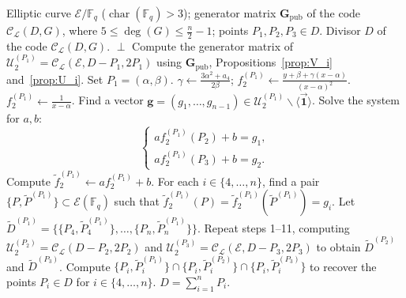 \documentclass[sn-mathphys-num]{sn-jnl_modified}
\newcommand{\FF}{\ensuremath{\mathbb{F}}}
\begin{document}
\begin{algorithm}[H]
\fontsize{9pt}{9pt}\selectfont
\caption{Recovering the divisor $D$}
\label{alg:attack}
\begin{algorithmic}[1]
\Require Elliptic curve $\mathcal{E}/\mathbb{F}_q$ ($\operatorname{char}(\mathbb{F}_q) > 3$); generator matrix $\mathbf{G}_{\operatorname{pub}}$ of the code $\mathcal{C}_\mathscr{L}(D, G)$, where $5 \leq \deg(G) \leq \frac{n}{2}-1$; points $P_1, P_2, P_3 \in D$.
\Ensure Divisor $D$ of the code $\mathcal{C}_\mathscr{L}(D, G)$.
\State \Return $\perp$ \Comment{Probability $1 - \mathcal{O}(|\mathcal{E}(\FF_q)|^{-2})$}
\EndIf
\State Compute the generator matrix of $\mathcal{U}_2^{(P_1)} = \mathcal{C}_\mathscr{L}(\mathcal{E}, D - P_1, 2P_1)$ using $\mathbf{G}_{\operatorname{pub}}$, Propositions~\ref{prop:V_i} and~\ref{prop:U_i}. Set $P_1 = (\alpha, \beta)$.
 
    \State $\gamma \gets \frac{3\alpha^2 + a_4}{2\beta}$; $f_2^{(P_1)} \gets \frac{y + \beta + \gamma (x - \alpha)}{(x - \alpha)^2}$.
\Else
    \State $f_2^{(P_1)} \gets \frac{1}{x - \alpha}$.
\EndIf
\State Find a vector $\mathbf{g} = (g_1, \dots, g_{n-1}) \in \mathcal{U}_2^{(P_1)} \backslash \langle\Vec{\mathbf{1}}\rangle$.
\State Solve the system for $a, b$:
\[
\begin{cases}
a f_2^{(P_1)}(P_2) + b = g_1, \\
a f_2^{(P_1)}(P_3) + b = g_2.
\end{cases}
\]
\State Compute $\widetilde{f}_2^{(P_1)} \gets a f_2^{(P_1)} + b$.
\State For each $i \in \{4, \dots, n\}$, find a pair $\{P, \widetilde{P}^{(P_1)}\} \subset \mathcal{E}(\mathbb{F}_q)$ such that $\widetilde{f}_2^{(P_1)}(P) = \widetilde{f}_2^{(P_1)}(\widetilde{P}^{(P_1)}) = g_i$. Let $\widetilde{D}^{(P_1)} = \{\{P_4, \widetilde{P}_4^{(P_1)}\}, \dots, \{P_n, \widetilde{P}_n^{(P_1)}\}\}$.
\State Repeat steps 1--11, computing $\mathcal{U}_2^{(P_2)} = \mathcal{C}_\mathscr{L}(D - P_2, 2P_2)$ and $\mathcal{U}_2^{(P_3)} = \mathcal{C}_\mathscr{L}(\mathcal{E}, D - P_3, 2P_3)$ to obtain $\widetilde{D}^{(P_2)}$ and $\widetilde{D}^{(P_3)}$.
\State Compute $\{P_i, \widetilde{P}_i^{(P_1)}\} \cap \{P_i, \widetilde{P}_i^{(P_2)}\} \cap \{P_i, \widetilde{P}_i^{(P_3)}\}$ to recover the points $P_i \in D$ for $i \in \{4, \dots, n\}$.
\State\Return $D = \sum_{i = 1}^{n} P_i$.
\end{algorithmic}
\end{algorithm}
\end{document}
